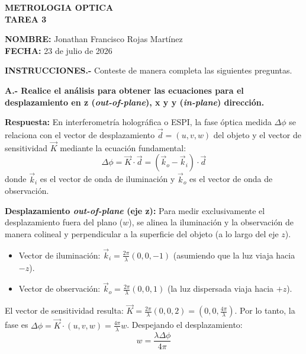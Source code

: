 \documentclass[12pt,letterpaper]{article}
\begin{document}
	
	\begin{center}
		\textbf{\Large METROLOGIA OPTICA} \\[0.3cm]
		\textbf{\large TAREA 3}
	\end{center}
	
	\vspace{0.5cm}
	\noindent \textbf{NOMBRE:} Jonathan Francisco Rojas Martínez \\
	\textbf{FECHA:} 23 de julio de 2026 \vspace{0.5cm}
	
	\noindent \textbf{INSTRUCCIONES.-} Conteste de manera completa las siguientes preguntas.
	
	\vspace{0.8cm}
	\noindent \textbf{A.- Realice el análisis para obtener las ecuaciones para el desplazamiento en z (\textit{out-of-plane}), x y y (\textit{in-plane}) dirección.}
	
	\textbf{Respuesta:}
	En interferometría holográfica o ESPI, la fase óptica medida $\Delta\phi$ se relaciona con el vector de desplazamiento $\vec{d} = (u, v, w)$ del objeto y el vector de sensitividad $\vec{K}$ mediante la ecuación fundamental:
	\[
	\Delta\phi = \vec{K} \cdot \vec{d} = (\vec{k}_o - \vec{k}_i) \cdot \vec{d}
	\]
	donde $\vec{k}_i$ es el vector de onda de iluminación y $\vec{k}_o$ es el vector de onda de observación.
	
	\textbf{Desplazamiento \textit{out-of-plane} (eje z):}
	Para medir exclusivamente el desplazamiento fuera del plano ($w$), se alinea la iluminación y la observación de manera colineal y perpendicular a la superficie del objeto (a lo largo del eje $z$).
	\begin{itemize}
		\item Vector de iluminación: $\vec{k}_i = \frac{2\pi}{\lambda}(0, 0, -1)$ (asumiendo que la luz viaja hacia $-z$).
		\item Vector de observación: $\vec{k}_o = \frac{2\pi}{\lambda}(0, 0, 1)$ (la luz dispersada viaja hacia $+z$).
	\end{itemize}
	El vector de sensitividad resulta: $\vec{K} = \frac{2\pi}{\lambda}(0, 0, 2) = (0, 0, \frac{4\pi}{\lambda})$.
	Por lo tanto, la fase es $\Delta\phi = \vec{K} \cdot (u, v, w) = \frac{4\pi}{\lambda} w$.
	Despejando el desplazamiento:
	\[
	w = \frac{\lambda \Delta\phi}{4\pi}
	\]
	
\end{document}
